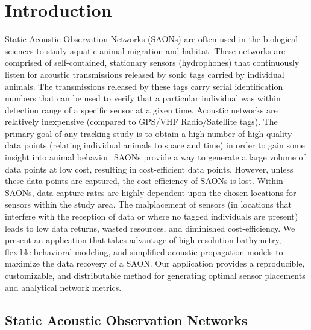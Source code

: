 \chapter{Introduction}
Static Acoustic Observation Networks (SAONs) are often used in the biological sciences to study aquatic animal migration and habitat.  These networks are comprised of self-contained, stationary sensors (hydrophones) that continuously listen for acoustic transmissions released by sonic tags carried by individual animals.  The transmissions released by these tags carry serial identification numbers that can be used to verify that a particular individual was within detection range of a specific sensor at a given time.  Acoustic networks are relatively inexpensive (compared to GPS/VHF Radio/Satellite tags).  The primary goal of any tracking study is to obtain a high number of high quality data points (relating individual animals to space and time) in order to gain some insight into animal behavior.  SAONs provide a way to generate a large volume of data points at low cost, resulting in cost-efficient data points.  However, unless these data points are captured, the cost efficiency of SAONs is lost.  Within SAONs, data capture rates are highly dependent upon the chosen locations for sensors within the study area.  The malplacement of sensors (in locations that interfere with the reception of data or where no tagged individuals are present) leads to low data returns, wasted resources, and diminished cost-efficiency.  We present an application that takes advantage of high resolution bathymetry, flexible behavioral modeling, and simplified acoustic propagation models to maximize the data recovery of a SAON.  Our application provides a reproducible, customizable, and distributable method for generating optimal sensor placements and analytical network metrics.

\section{Static Acoustic Observation Networks}
